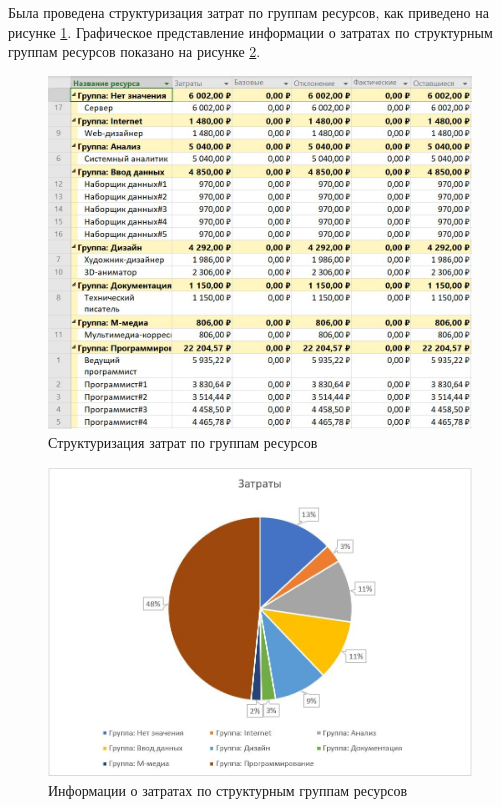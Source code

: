 Была проведена структуризация затрат по группам ресурсов, как приведено на рисунке \ref{img:task3-new-costs}. Графическое представление информации о затратах по структурным группам ресурсов показано на рисунке \ref{img:task3-graph-costs}.

\begin{figure}[H]
	\begin{center}
		\includegraphics[scale=0.3]{inc/img/task3-new-costs.jpg}
	\end{center}
	\captionsetup{justification=centering}
	\caption{Структуризация затрат по группам ресурсов}
	\label{img:task3-new-costs}
\end{figure}

\begin{figure}[H]
	\begin{center}
		\includegraphics[scale=0.4]{inc/img/task3-graph-costs.jpg}
	\end{center}
	\captionsetup{justification=centering}
	\caption{Информации о затратах по структурным группам ресурсов}
	\label{img:task3-graph-costs}
\end{figure}

